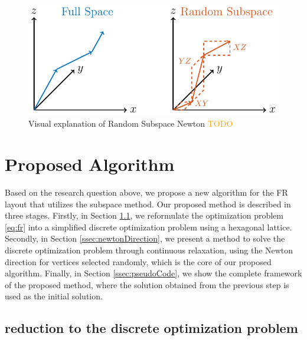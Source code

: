 \documentclass[dvipdfmx,lettersize,journal]{IEEEtran}
\newcommand{\orange}[1]{\textcolor{orange}{#1}}
\begin{document}
\begin{figure}[t]
  \centering
  \includegraphics[width=\columnwidth]{randomSubspace/randomSubspace.pdf}
  \caption{
    Visual explanation of Random Subspace Newton
    \orange{TODO}
  }
  \label{fig:randomSubspace}
\end{figure}

\section{Proposed Algorithm}\label{sec:algorithm}

Based on the research question above, we propose a new algorithm for the FR layout that utilizes the subspace method.
Our proposed method is described in three stages.
Firstly, in Section \ref{ssec:reduction}, we reformulate the optimization problem \eqref{eq:fr} into a simplified discrete optimization problem using a hexagonal lattice.
Secondly, in Section \ref{ssec:newtonDirection}, we present a method to solve the discrete optimization problem through continuous relaxation, using the Newton direction for vertices selected randomly, which is the core of our proposed algorithm.
Finally, in Section \ref{ssec:pseudoCode}, we show the complete framework of the proposed method, where the solution obtained from the previous step is used as the initial solution.

\subsection{reduction to the discrete optimization problem}\label{ssec:reduction}
\end{document}
